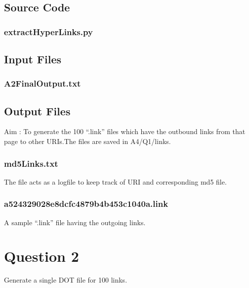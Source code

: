 \documentclass[12pt]{article}
\begin{document}
\subsection{Source Code}
\subsubsection{extractHyperLinks.py}

\newpage
\subsection{Input Files}
\subsubsection{A2FinalOutput.txt}

\newpage
\subsection{Output Files}
Aim : To generate the 100 ``.link'' files which have the outbound links from that page to other URIs.The files are saved in A4/Q1/links.
\subsubsection{md5Links.txt}
The file acts as a logfile to keep track of URI and corresponding md5 file.


\subsubsection{a524329028e8dcfc4879b4b453c1040a.link}
A sample ``.link'' file having the outgoing links.

\newpage

\section{Question 2}
Generate a single DOT file for 100 links. 
\end{document}
